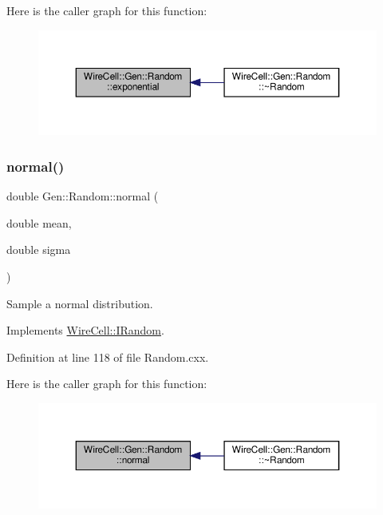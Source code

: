 Here is the caller graph for this function\+:
\nopagebreak
\begin{figure}[H]
\begin{center}
\leavevmode
\includegraphics[width=350pt]{class_wire_cell_1_1_gen_1_1_random_adc1edd1dadf04f9e78d1c6480f6f4f1a_icgraph}
\end{center}
\end{figure}
\mbox{\label{class_wire_cell_1_1_gen_1_1_random_a0efe5c29dec850c78a0013a30f011320}} 
\subsubsection{\texorpdfstring{normal()}{normal()}}
{\footnotesize\ttfamily double Gen\+::\+Random\+::normal (\begin{DoxyParamCaption}\item[{double}]{mean,  }\item[{double}]{sigma }\end{DoxyParamCaption})\hspace{0.3cm}{\ttfamily [virtual]}}



Sample a normal distribution. 



Implements \hyperlink{class_wire_cell_1_1_i_random_a6a24d8800300de9f8b735277dc0268d4}{Wire\+Cell\+::\+I\+Random}.



Definition at line 118 of file Random.\+cxx.

Here is the caller graph for this function\+:
\nopagebreak
\begin{figure}[H]
\begin{center}
\leavevmode
\includegraphics[width=350pt]{class_wire_cell_1_1_gen_1_1_random_a0efe5c29dec850c78a0013a30f011320_icgraph}
\end{center}
\end{figure}
\mbox{\label{class_wire_cell_1_1_gen_1_1_random_abf2ad8cda2e34f349f073a148dd5ac58}} 
